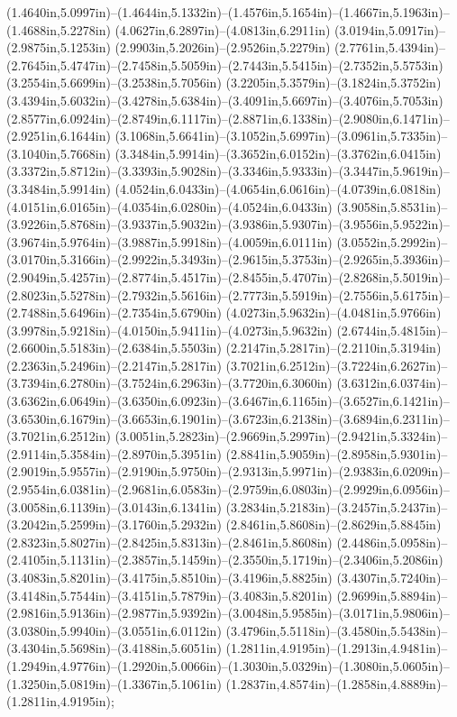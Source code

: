 (1.4640in,5.0997in)--(1.4644in,5.1332in)--(1.4576in,5.1654in)--(1.4667in,5.1963in)--(1.4688in,5.2278in) (4.0627in,6.2897in)--(4.0813in,6.2911in) (3.0194in,5.0917in)--(2.9875in,5.1253in) (2.9903in,5.2026in)--(2.9526in,5.2279in) (2.7761in,5.4394in)--(2.7645in,5.4747in)--(2.7458in,5.5059in)--(2.7443in,5.5415in)--(2.7352in,5.5753in) (3.2554in,5.6699in)--(3.2538in,5.7056in) (3.2205in,5.3579in)--(3.1824in,5.3752in) (3.4394in,5.6032in)--(3.4278in,5.6384in)--(3.4091in,5.6697in)--(3.4076in,5.7053in) (2.8577in,6.0924in)--(2.8749in,6.1117in)--(2.8871in,6.1338in)--(2.9080in,6.1471in)--(2.9251in,6.1644in) (3.1068in,5.6641in)--(3.1052in,5.6997in)--(3.0961in,5.7335in)--(3.1040in,5.7668in) (3.3484in,5.9914in)--(3.3652in,6.0152in)--(3.3762in,6.0415in) (3.3372in,5.8712in)--(3.3393in,5.9028in)--(3.3346in,5.9333in)--(3.3447in,5.9619in)--(3.3484in,5.9914in) (4.0524in,6.0433in)--(4.0654in,6.0616in)--(4.0739in,6.0818in) (4.0151in,6.0165in)--(4.0354in,6.0280in)--(4.0524in,6.0433in) (3.9058in,5.8531in)--(3.9226in,5.8768in)--(3.9337in,5.9032in)--(3.9386in,5.9307in)--(3.9556in,5.9522in)--(3.9674in,5.9764in)--(3.9887in,5.9918in)--(4.0059in,6.0111in) (3.0552in,5.2992in)--(3.0170in,5.3166in)--(2.9922in,5.3493in)--(2.9615in,5.3753in)--(2.9265in,5.3936in)--(2.9049in,5.4257in)--(2.8774in,5.4517in)--(2.8455in,5.4707in)--(2.8268in,5.5019in)--(2.8023in,5.5278in)--(2.7932in,5.5616in)--(2.7773in,5.5919in)--(2.7556in,5.6175in)--(2.7488in,5.6496in)--(2.7354in,5.6790in) (4.0273in,5.9632in)--(4.0481in,5.9766in) (3.9978in,5.9218in)--(4.0150in,5.9411in)--(4.0273in,5.9632in) (2.6744in,5.4815in)--(2.6600in,5.5183in)--(2.6384in,5.5503in) (2.2147in,5.2817in)--(2.2110in,5.3194in) (2.2363in,5.2496in)--(2.2147in,5.2817in) (3.7021in,6.2512in)--(3.7224in,6.2627in)--(3.7394in,6.2780in)--(3.7524in,6.2963in)--(3.7720in,6.3060in) (3.6312in,6.0374in)--(3.6362in,6.0649in)--(3.6350in,6.0923in)--(3.6467in,6.1165in)--(3.6527in,6.1421in)--(3.6530in,6.1679in)--(3.6653in,6.1901in)--(3.6723in,6.2138in)--(3.6894in,6.2311in)--(3.7021in,6.2512in) (3.0051in,5.2823in)--(2.9669in,5.2997in)--(2.9421in,5.3324in)--(2.9114in,5.3584in)--(2.8970in,5.3951in) (2.8841in,5.9059in)--(2.8958in,5.9301in)--(2.9019in,5.9557in)--(2.9190in,5.9750in)--(2.9313in,5.9971in)--(2.9383in,6.0209in)--(2.9554in,6.0381in)--(2.9681in,6.0583in)--(2.9759in,6.0803in)--(2.9929in,6.0956in)--(3.0058in,6.1139in)--(3.0143in,6.1341in) (3.2834in,5.2183in)--(3.2457in,5.2437in)--(3.2042in,5.2599in)--(3.1760in,5.2932in) (2.8461in,5.8608in)--(2.8629in,5.8845in) (2.8323in,5.8027in)--(2.8425in,5.8313in)--(2.8461in,5.8608in) (2.4486in,5.0958in)--(2.4105in,5.1131in)--(2.3857in,5.1459in)--(2.3550in,5.1719in)--(2.3406in,5.2086in) (3.4083in,5.8201in)--(3.4175in,5.8510in)--(3.4196in,5.8825in) (3.4307in,5.7240in)--(3.4148in,5.7544in)--(3.4151in,5.7879in)--(3.4083in,5.8201in) (2.9699in,5.8894in)--(2.9816in,5.9136in)--(2.9877in,5.9392in)--(3.0048in,5.9585in)--(3.0171in,5.9806in)--(3.0380in,5.9940in)--(3.0551in,6.0112in) (3.4796in,5.5118in)--(3.4580in,5.5438in)--(3.4304in,5.5698in)--(3.4188in,5.6051in) (1.2811in,4.9195in)--(1.2913in,4.9481in)--(1.2949in,4.9776in)--(1.2920in,5.0066in)--(1.3030in,5.0329in)--(1.3080in,5.0605in)--(1.3250in,5.0819in)--(1.3367in,5.1061in) (1.2837in,4.8574in)--(1.2858in,4.8889in)--(1.2811in,4.9195in);
